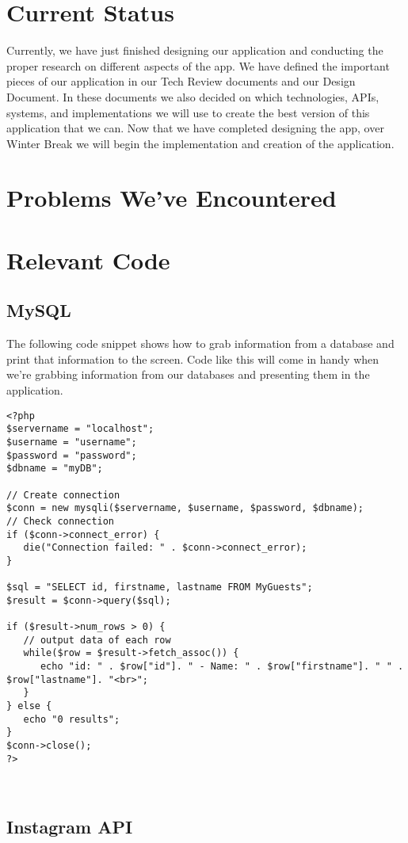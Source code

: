 \documentclass[draftclsnofoot, onecolumn, 10pt, compsoc]{IEEEtran}
\begin{document}
   \section{Current Status}
   Currently, we have just finished designing our application and conducting the proper research on different aspects of the app. We have defined the important pieces of our application in our Tech Review documents and our Design Document. In these documents we also decided on which technologies, APIs, systems, and implementations we will use to create the best version of this application that we can. Now that we have completed designing the app, over Winter Break we will begin the implementation and creation of the application.
   \section{Problems We've Encountered}
   \section{Relevant Code}
      \subsection{MySQL}
      The following code snippet shows how to grab information from a database and print that information to the screen. Code like this will come in handy when we're grabbing information from our databases and presenting them in the application.
      \begin{lstlisting}[style=php]
<?php
$servername = "localhost";
$username = "username";
$password = "password";
$dbname = "myDB";

// Create connection
$conn = new mysqli($servername, $username, $password, $dbname);
// Check connection
if ($conn->connect_error) {
   die("Connection failed: " . $conn->connect_error);
}

$sql = "SELECT id, firstname, lastname FROM MyGuests";
$result = $conn->query($sql);

if ($result->num_rows > 0) {
   // output data of each row
   while($row = $result->fetch_assoc()) {
      echo "id: " . $row["id"]. " - Name: " . $row["firstname"]. " " . $row["lastname"]. "<br>";
   }
} else {
   echo "0 results";
}
$conn->close();
?>
      \end{lstlisting}
      ~\cite{MySQL}
      \subsection{Instagram API}
      ~\cite{InstaAPI}
\end{document}
